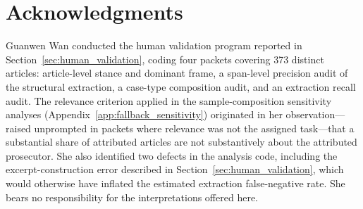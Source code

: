 \documentclass[12pt, letterpaper]{article}
\begin{document}
\section*{Acknowledgments}

Guanwen Wan conducted the human validation program reported in
Section~\ref{sec:human_validation}, coding four packets covering 373 distinct
articles: article-level stance and dominant frame, a span-level precision audit
of the structural extraction, a case-type composition audit, and an extraction
recall audit. The relevance criterion applied in the sample-composition
sensitivity analyses (Appendix~\ref{app:fallback_sensitivity}) originated in her
observation---raised unprompted in packets where relevance was not the assigned
task---that a substantial share of attributed articles are not substantively
about the attributed prosecutor. She also identified two defects in the analysis
code, including the excerpt-construction error described in
Section~\ref{sec:human_validation}, which would otherwise have inflated the
estimated extraction false-negative rate. She bears no responsibility for the
interpretations offered here.



\end{document}
